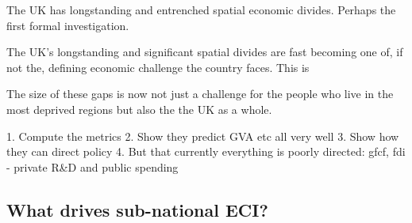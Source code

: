 




The UK has longstanding and entrenched spatial economic divides. Perhaps the first formal investigation.

The UK's longstanding and significant spatial divides are fast becoming one of, if not the, defining economic challenge the country faces. This is

The size of these gaps is now not just a challenge for the people who live in the most deprived regions but also the the UK as a whole. 



1. Compute the metrics 
2. Show they predict GVA etc all very well 
3. Show how they can direct policy 
4. But that currently everything is poorly directed: gfcf, fdi - private R&D and public spending 



\subsection{What drives sub-national ECI?}